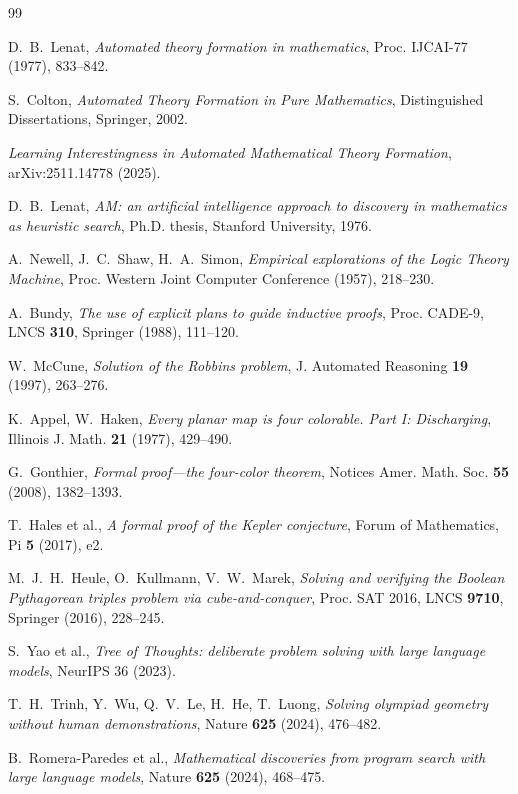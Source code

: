 \documentclass[11pt]{amsart}
\theoremstyle{definition}
\theoremstyle{remark}
\begin{document}
\begin{thebibliography}{99}
\itemsep2pt

 D.~B.~Lenat, \emph{Automated theory formation in
mathematics}, Proc. IJCAI-77 (1977), 833--842.

 S.~Colton, \emph{Automated Theory Formation in Pure
Mathematics}, Distinguished Dissertations, Springer, 2002.

 \emph{Learning Interestingness in Automated
Mathematical Theory Formation}, arXiv:2511.14778 (2025).

 D.~B.~Lenat, \emph{AM: an artificial intelligence approach to
discovery in mathematics as heuristic search}, Ph.D. thesis, Stanford
University, 1976.

 A.~Newell, J.~C.~Shaw, H.~A.~Simon, \emph{Empirical
explorations of the Logic Theory Machine}, Proc. Western Joint Computer
Conference (1957), 218--230.

 A.~Bundy, \emph{The use of explicit plans to guide inductive
proofs}, Proc. CADE-9, LNCS \textbf{310}, Springer (1988), 111--120.

 W.~McCune, \emph{Solution of the Robbins problem}, J.
Automated Reasoning \textbf{19} (1997), 263--276.

 K.~Appel, W.~Haken, \emph{Every planar map is four
colorable. Part I: Discharging}, Illinois J. Math. \textbf{21} (1977), 429--490.

 G.~Gonthier, \emph{Formal proof---the four-color theorem},
Notices Amer. Math. Soc. \textbf{55} (2008), 1382--1393.

 T.~Hales et al., \emph{A formal proof of the Kepler
conjecture}, Forum of Mathematics, Pi \textbf{5} (2017), e2.

 M.~J.~H.~Heule, O.~Kullmann, V.~W.~Marek, \emph{Solving and
verifying the Boolean Pythagorean triples problem via cube-and-conquer}, Proc.
SAT 2016, LNCS \textbf{9710}, Springer (2016), 228--245.

 S.~Yao et al., \emph{Tree of Thoughts: deliberate problem
solving with large language models}, NeurIPS 36 (2023).

 T.~H.~Trinh, Y.~Wu, Q.~V.~Le, H.~He, T.~Luong, \emph{Solving
olympiad geometry without human demonstrations}, Nature \textbf{625} (2024),
476--482.

 B.~Romera-Paredes et al., \emph{Mathematical
discoveries from program search with large language models}, Nature \textbf{625}
(2024), 468--475.


\end{thebibliography}
\end{document}

